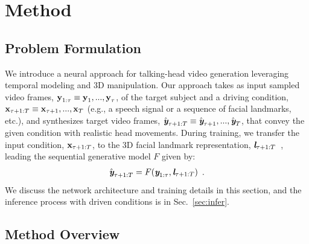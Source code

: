 \documentclass[runningheads]{llncs}
\def\mathbi#1{\textbf{\em #1}}
\providecommand{\CXu}[1]{\textcolor{red}{[{\bf #1}]}}
\begin{document}
\section{Method}
\label{sec:method}



\subsection{Problem Formulation}
\label{subsec:problem_formulation}

We introduce a neural approach for talking-head video generation leveraging temporal modeling and 3D manipulation. Our approach takes as input sampled video frames, $\mathbi{\mathbi{y}}_{1:\tau} \equiv \mathbi{\mathbi{y}}_1,...,\mathbi{\mathbi{y}}_{\tau}$, of the target subject and a driving condition, $\mathbi{\mathbi{x}}_{\tau+ 1:T}  \equiv \mathbi{\mathbi{x}}_{\tau + 1},...,\mathbi{\mathbi{x}}_T$ (e.g., a speech signal or a sequence of facial landmarks, etc.), and synthesizes target video frames, $\hat{\mathbi{y}}_{\tau + 1:T}  \equiv \hat{\mathbi{y}}_{\tau + 1}, ...,\hat{\mathbi{y}}_T$, that convey the given condition with realistic head movements. During training, we transfer the input condition, $\mathbi{\mathbi{x}}_{\tau+ 1:T}$, to the 3D facial landmark representation, $\mathbi{l}_{\tau+1: T}$~\cite{feng2018joint}, leading the sequential generative model $F$ given by:
\begin{equation}
\begin{aligned}
\hat{\mathbi{y}}_{ \tau+1:T} =  F( \mathbi{y}_{1:\tau},\mathbi{l}_{\tau+1:T}  )  \enspace.
\end{aligned}
\label{eq:training}    
\end{equation}
We discuss the network architecture and training details in this section, and the inference process with driven conditions is in Sec.~\ref{sec:infer}.

\subsection{Method Overview}
\label{subsec:overview}
\end{document}
